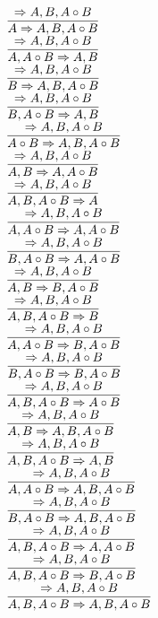 \documentclass[11pt]{article}
\begin{document}
\begin{center}
\\$\infer{A\Rightarrow A, B, A\circ B}{\Rightarrow A, B, A\circ B}$
\bigskip
\\$\infer{A, A\circ B\Rightarrow A, B}{\Rightarrow A, B, A\circ B}$
\bigskip
\\$\infer{B\Rightarrow A, B, A\circ B}{\Rightarrow A, B, A\circ B}$
\bigskip
\\$\infer{B, A\circ B\Rightarrow A, B}{\Rightarrow A, B, A\circ B}$
\bigskip
\\$\infer{A\circ B\Rightarrow A, B, A\circ B}{\Rightarrow A, B, A\circ B}$
\bigskip
\\$\infer{A, B\Rightarrow A, A\circ B}{\Rightarrow A, B, A\circ B}$
\bigskip
\\$\infer{A, B, A\circ B\Rightarrow A}{\Rightarrow A, B, A\circ B}$
\bigskip
\\$\infer{A, A\circ B\Rightarrow A, A\circ B}{\Rightarrow A, B, A\circ B}$
\bigskip
\\$\infer{B, A\circ B\Rightarrow A, A\circ B}{\Rightarrow A, B, A\circ B}$
\bigskip
\\$\infer{A, B\Rightarrow B, A\circ B}{\Rightarrow A, B, A\circ B}$
\bigskip
\\$\infer{A, B, A\circ B\Rightarrow B}{\Rightarrow A, B, A\circ B}$
\bigskip
\\$\infer{A, A\circ B\Rightarrow B, A\circ B}{\Rightarrow A, B, A\circ B}$
\bigskip
\\$\infer{B, A\circ B\Rightarrow B, A\circ B}{\Rightarrow A, B, A\circ B}$
\bigskip
\\$\infer{A, B, A\circ B\Rightarrow A\circ B}{\Rightarrow A, B, A\circ B}$
\bigskip
\\$\infer{A, B\Rightarrow A, B, A\circ B}{\Rightarrow A, B, A\circ B}$
\bigskip
\\$\infer{A, B, A\circ B\Rightarrow A, B}{\Rightarrow A, B, A\circ B}$
\bigskip
\\$\infer{A, A\circ B\Rightarrow A, B, A\circ B}{\Rightarrow A, B, A\circ B}$
\bigskip
\\$\infer{B, A\circ B\Rightarrow A, B, A\circ B}{\Rightarrow A, B, A\circ B}$
\bigskip
\\$\infer{A, B, A\circ B\Rightarrow A, A\circ B}{\Rightarrow A, B, A\circ B}$
\bigskip
\\$\infer{A, B, A\circ B\Rightarrow B, A\circ B}{\Rightarrow A, B, A\circ B}$
\bigskip
\\$\infer{A, B, A\circ B\Rightarrow A, B, A\circ B}{\Rightarrow A, B, A\circ B}$
\bigskip
\\
\end{center}
\end{document}
